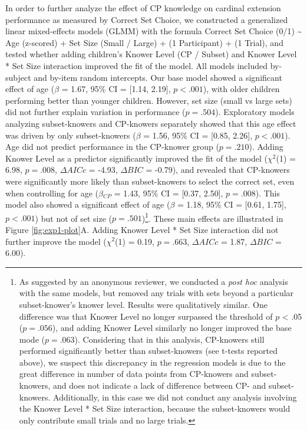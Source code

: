 \documentclass[
  man,floatsintext]{apa7}
\begin{document}
In order to further analyze the effect of CP knowledge on cardinal extension performance as measured by Correct Set Choice, we constructed a generalized linear mixed-effects models (GLMM) with the formula Correct Set Choice (0/1) \textasciitilde{} Age (z-scored) + Set Size (Small / Large) + (1 \textbar{} Participant) + (1 \textbar{} Trial), and tested whether adding children's Knower Level (CP / Subset) and Knower Level * Set Size interaction improved the fit of the model. All models included by-subject and by-item random intercepts.
Our base model showed a significant effect of age (\(\beta\) = 1.67, 95\% CI = {[}1.14, 2.19{]}, \(p < .001\)), with older children performing better than younger children. However, set size (small vs large sets) did not further explain variation in performance (\(p = .504\)). Exploratory models analyzing subset-knowers and CP-knowers separately showed that this age effect was driven by only subset-knowers (\(\beta\) = 1.56, 95\% CI = {[}0.85, 2.26{]}, \(p < .001\)). Age did not predict performance in the CP-knower group (\(p = .210\)). Adding Knower Level as a predictor significantly improved the fit of the model (\(\chi^2\)(1) = 6.98, \(p = .008\), \(\Delta AICc\) = -4.93, \(\Delta BIC\) = -0.79), and revealed that CP-knowers were significantly more likely than subset-knowers to select the correct set, even when controlling for age (\(\beta\)\(_{CP}\) = 1.43, 95\% CI = {[}0.37, 2.50{]}, \(p = .008\)). This model also showed a significant effect of age (\(\beta\) = 1.18, 95\% CI = {[}0.61, 1.75{]}, \(p < .001\)) but not of set size (\(p = .501\))\footnote{As suggested by an anonymous reviewer, we conducted a \emph{post hoc} analysis with the same models, but removed any trials with sets beyond a particular subset-knower's knower level. Results were qualitatively similar. One difference was that Knower Level no longer surpassed the threshold of \(p\) \textless{} .05 (\(p = .056\)), and adding Knower Level similarly no longer improved the base mode (\(p = .063\)). Considering that in this analysis, CP-knowers still performed significantly better than subset-knowers (see t-tests reported above), we suspect this discrepancy in the regression models is due to the great difference in number of data points from CP-knowers and subset-knowers, and does not indicate a lack of difference between CP- and subset-knowers. Additionally, in this case we did not conduct any analysis involving the Knower Level * Set Size interaction, because the subset-knowers would only contribute small trials and no large trials.}.
These main effects are illustrated in Figure \ref{fig:exp1-plot}A. Adding Knower Level * Set Size interaction did not further improve the model (\(\chi^2\)(1) = 0.19, \(p = .663\), \(\Delta AICc\) = 1.87, \(\Delta BIC\) = 6.00).
\end{document}
